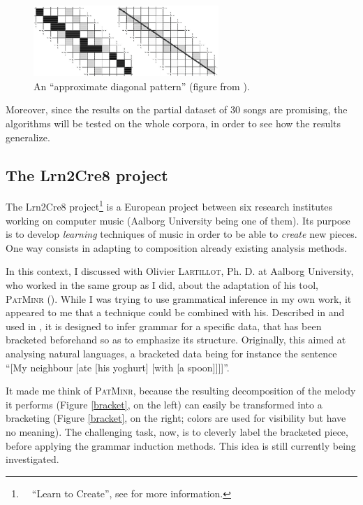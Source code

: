 \documentclass[a4paper,10pt]{article}
\newcommand{\guill}[1]{“#1”}
\begin{document}
\begin{figure}[h!]
\centering
\includegraphics[width=7cm]{images/aucouturier.jpg}
\caption{An \guill{approximate diagonal pattern} (figure from \cite{aucouturier2002finding}).\label{aucouturier}}
\end{figure}

Moreover, since the results on the partial dataset of 30 songs are promising, the algorithms will be tested on the whole corpora, in order to see how the results generalize.


\subsection{The Lrn2Cre8 project}

The Lrn2Cre8 project\footnote{~~\guill{Learn to Create}, see \cite{Lrn2Cre8} for more information.} is a European project between six research institutes working on computer music (Aalborg University being one of them). Its purpose is to develop \emph{learning} techniques of music in order to be able to \emph{create} new pieces. One way consists in adapting to composition already existing analysis methods.

In this context, I discussed with Olivier \textsc{Lartillot}, Ph. D. at Aalborg University, who worked in the same group as I did, about the adaptation of his tool, \textsc{PatMinr} (\cite{patminr}).
While I was trying to use grammatical inference in my own work, it appeared to me that a technique could be combined with his. Described in \cite{bracket2} and used in \cite{bracket1}, it is designed to infer grammar for a specific data, that has been bracketed beforehand so as to emphasize its structure. Originally, this aimed at analysing natural languages, a bracketed data being for instance the sentence \guill{[My neighbour [ate [his yoghurt] [with [a spoon]]]]}.

It made me think of \textsc{PatMinr}, because the resulting decomposition of the melody it performs (Figure \ref{bracket}, on the left) can easily be transformed into a bracketing (Figure \ref{bracket}, on the right; colors are used for visibility but have no meaning). The challenging task, now, is to cleverly label the bracketed piece, before applying the grammar induction methods. This idea is still currently being investigated.
\end{document}

